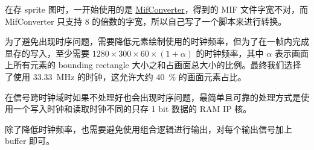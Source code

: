 \documentclass[UTF8, 11pt, fontset=none]{ctexart}
\begin{document}
在存 sprite 图时，一开始使用的是 \href{https://github.com/thu-cs-lab/MifConverter}{MifConverter}，得到的 MIF 文件字宽不对，而 MifConverter 只支持 8 的倍数的字宽，所以自己写了一个脚本来进行转换。

为了避免出现时序问题，需要降低元素绘制使用的时钟频率，但为了在一帧内完成显存的写入，至少需要 $1280 \times 300 \times 60 \times (1+\alpha)$ 的时钟频率，其中 $\alpha$ 表示画面上所有元素的 bounding rectangle 大小之和占画面总大小的比例。最终我们选择了使用 \SI{33.33}{\mega\hertz} 的时钟，这允许大约 \SI{40}{\percent} 的画面元素占比。

在信号跨时钟域时如果不处理好也会出现时序问题，最简单且可靠的处理方式是使用一个写入时钟和读取时钟不同的只存 1 bit 数据的 RAM IP 核。

除了降低时钟频率，也需要避免使用组合逻辑进行输出，对每个输出信号加上 buffer 即可。
\end{document}
